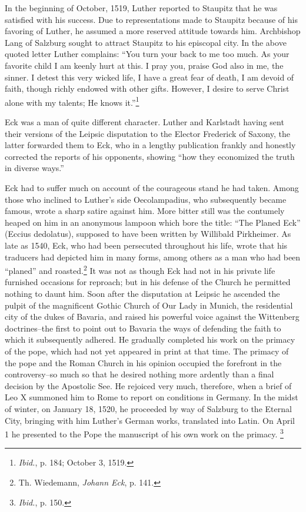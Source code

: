 In the beginning of October, 1519, Luther reported to Staupitz
that he was satisfied with his success. Due to representations made to
Staupitz because of his favoring of Luther, he assumed a more reserved
attitude towards him. Archbishop Lang of Salzburg sought
to attract Staupitz to his episcopal city. In the above quoted letter
Luther complains: “You turn your back to me too much. As your
favorite child I am keenly hurt at this. I pray you, praise God also
in me, the sinner. I detest this very wicked life, I have a great fear
of death, I am devoid of faith, though richly endowed with other
gifts. However, I desire to serve Christ alone with my talents; He
knows it.”\footnote{\textit{Ibid.}, p. 184; October 3, 1519.}

Eck was a man of quite different character. Luther and Karlstadt
having sent their versions of the Leipsic disputation to the Elector
Frederick of Saxony, the latter forwarded them to Eck, who in
a lengthy publication frankly and honestly corrected the reports of
his opponents, showing “how they economized the truth in diverse
ways.”

Eck had to suffer much on account of the courageous stand he
had taken. Among those who inclined to Luther’s side Oecolampadius,
who subsequently became famous, wrote a sharp satire against him.
More bitter still was the contumely heaped on him in an anonymous
lampoon which bore the title: “The Planed Eck” (Eccius dedolatus),
supposed to have been written by Willibald Pirkheimer. As late as
1540, Eck, who had been persecuted throughout his life, wrote that his
traducers had depicted him in many forms, among others as a man who
had been “planed” and roasted.\footnote{Th. Wiedemann, \textit{Johann Eck}, p. 141.}
It was not as though Eck had not in
his private life furnished occasions for reproach; but in his defense
of the Church he permitted nothing to daunt him. Soon after the
disputation at Leipsic he ascended the pulpit of the magnificent
Gothic Church of Our Lady in Munich, the residential city of the
dukes of Bavaria, and raised his powerful voice against the Wittenberg
doctrines--the first to point out to Bavaria the ways of defending the
faith to which it subsequently adhered. He gradually completed his work
on the primacy of the pope, which had not yet
appeared in print at that time. The primacy of the pope and the
Roman Church in his opinion occupied the forefront in the controversy--so
much so that he desired nothing more ardently than a
final decision by the Apostolic See. He rejoiced very much, therefore,
when a brief of Leo X summoned him to Rome to report on
conditions in Germany. In the midst of winter, on January 18,
1520, he proceeded by way of Salzburg to the Eternal City, bringing with
him Luther’s German works, translated into Latin. On April
1 he presented to the Pope the manuscript of his own work on the
primacy. \footnote{\textit{Ibid.}, p. 150.}
